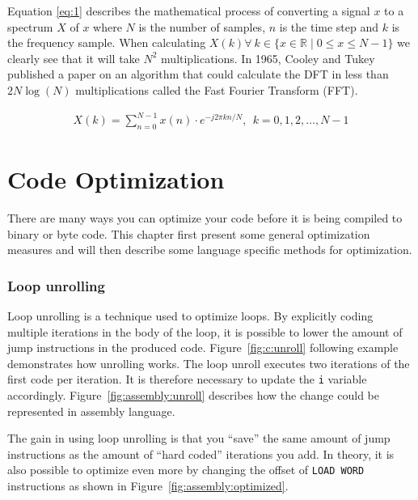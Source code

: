 Equation \ref{eq:1} \cite[p.~92]{tan2013digital} describes the mathematical process of converting a signal $x$ to a spectrum $X$ of $x$ where $N$ is the number of samples, $n$ is the time step and $k$ is the frequency sample. When calculating $X\left(k\right) \forall\ k \in \{x \in \mathbb{R} \mid 0 \leq x \leq N - 1\}$ we clearly see that it will take $N^2$ multiplications. In 1965, Cooley and Tukey published a paper on an algorithm that could calculate the DFT in less than $2N\log(N)$ multiplications \cite{Cooley1964} called the Fast Fourier Transform (FFT).

\begin{align}
    X\left(k\right) = \sum\limits_{n=0}^{N-1}x\left(n\right)\cdot e^{-j2\pi kn/N},\ \ k = 0,1,2,\dots,N-1\label{eq:1}
\end{align}

\section{Code Optimization}

There are many ways you can optimize your code before it is being compiled to binary or byte code. This chapter first present some general optimization measures and will then describe some language specific methods for optimization.

\subsubsection{Loop unrolling}
Loop unrolling is a technique used to optimize loops. By explicitly coding multiple iterations in the body of the loop, it is possible to lower the amount of jump instructions in the produced code. Figure~\ref{fig:c:unroll} following example demonstrates how unrolling works. The loop unroll executes two iterations of the first code per iteration. It is therefore necessary to update the \texttt{i} variable accordingly. Figure~\ref{fig:assembly:unroll} describes how the change could be represented in assembly language.

The gain in using loop unrolling is that you \enquote{save} the same amount of jump instructions as the amount of \enquote{hard coded} iterations you add. In theory, it is also possible to optimize even more by changing the offset of \texttt{LOAD WORD} instructions as shown in Figure~\ref{fig:assembly:optimized}.

